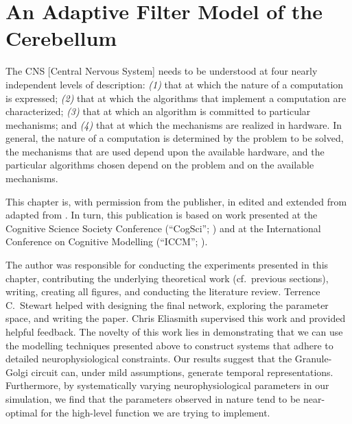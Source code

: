 
\chapter{An Adaptive Filter Model of the Cerebellum}
\label{chp:cerebellum}

\vspace{15pt}

\begin{OpeningQuote}
The CNS [Central Nervous System] needs to be understood at four nearly independent levels of description: \emph{(1)} that at which the nature of a computation is expressed; \emph{(2)} that at which the algorithms that implement a computation are characterized; \emph{(3)} that at which an algorithm is committed to particular mechanisms; and \emph{(4)} that at which the mechanisms are realized in hardware.
In general, the nature of a computation is determined by the problem to be solved, the mechanisms that are used depend upon the available hardware, and the particular algorithms chosen depend on the problem and on the available mechanisms.
\end{OpeningQuote}

\begin{PriorPublication}
This chapter is, with permission from the publisher, in edited and extended from adapted from \citet{stockel2021connecting}.
In turn, this publication is based on work presented at the Cognitive Science Society Conference (\enquote{CogSci}; \cite{stockel2020biologically}) and at the International Conference on Cognitive Modelling (\enquote{ICCM}; \cite{stockel2020connecting}).
\end{PriorPublication}

\begin{Contributions}
The author was responsible for conducting the experiments presented in this chapter, contributing the underlying theoretical work (cf.~previous sections), writing, creating all figures, and conducting the literature review.
Terrence C.~Stewart helped with designing the final network, exploring the parameter space, and writing the paper.
Chris Eliasmith supervised this work and provided helpful feedback.
The novelty of this work lies in demonstrating that we can use the modelling techniques presented above to construct systems that adhere to detailed neurophysiological constraints.
Our results suggest that the Granule-Golgi circuit can, under mild assumptions, generate temporal representations.
Furthermore, by systematically varying neurophysiological parameters in our simulation, we find that the parameters observed in nature tend to be near-optimal for the high-level function we are trying to implement.
\end{Contributions}

